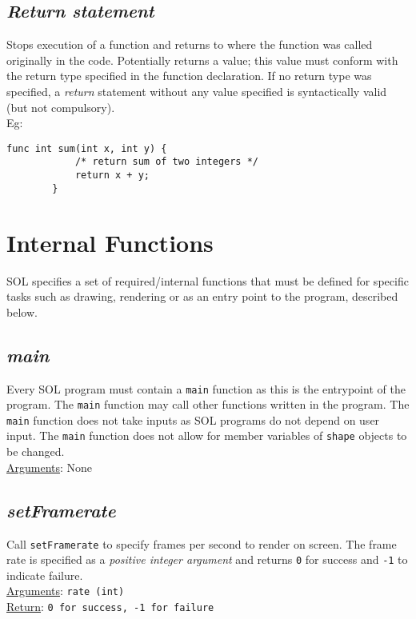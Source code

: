 \documentclass[letterpaper,12pt]{article}
\begin{document}
\subsection{\textit{Return statement}}
Stops execution of a function and returns to where the function was called originally in the code. Potentially returns a value; this value must conform with the return type specified in the function declaration. If no return type was specified, a \textit{return} statement without any value specified is syntactically valid (but not compulsory).\\
Eg: \begin{lstlisting}[aboveskip=-13pt]
        func int sum(int x, int y) {
            /* return sum of two integers */
            return x + y;
        }
    \end{lstlisting}
    
    \section{Internal Functions} \label{internal}
    SOL specifies a set of required/internal functions that must be defined for specific tasks such as drawing, rendering or as an entry point to the program, described below.
    
    \subsection{\textit{main}}
    Every SOL program must contain a \texttt{main} function as this is the entrypoint of the program. The \texttt{main} function may call other functions written in the program. The \texttt{main} function does not take inputs as SOL programs do not depend on user input. The \texttt{main} function does not allow for member variables of \texttt{shape} objects to be changed.\\
    \underline{Arguments}: None
    
    \subsection{\textit{setFramerate}}
    Call \texttt{setFramerate} to specify frames per second to render on screen. The frame rate is specified as a \textit{positive integer argument} and returns \texttt{0} for success and \texttt{-1} to indicate failure.\\
    \underline{Arguments}: \texttt{rate (int)}\\
    \underline{Return}: \texttt{0 for success, -1 for failure}
    
\end{document}
